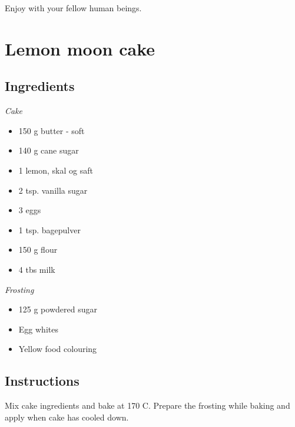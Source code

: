 \documentclass[11pt]{article}
\begin{document}
Enjoy with your fellow human beings.

\section{Lemon moon cake}

\subsection*{Ingredients}

\textit{Cake}
\begin{itemize}
    \item 150 g butter - soft
    \item 140 g cane sugar
    \item 1 lemon, skal og saft
    \item 2 tsp. vanilla sugar
    \item 3 eggs
    \item 1 tsp. bagepulver
    \item 150 g flour
    \item 4 tbs milk
\end{itemize}

\textit{Frosting}
\begin{itemize}
    \item 125 g powdered sugar
    \item Egg whites
    \item Yellow food colouring
\end{itemize}

\subsection*{Instructions}

Mix cake ingredients and bake at 170 C\textdegree. Prepare the frosting while baking
and apply when cake has cooled down.
\end{document}
